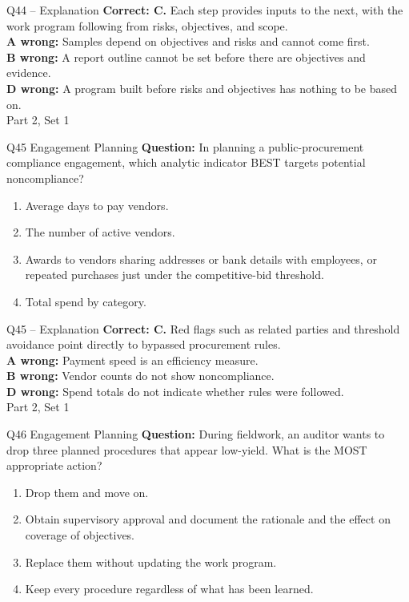 \documentclass[aspectratio=169,10pt]{beamer}
\begin{document}
\begin{frame}[t]{Q44 -- Explanation}
	\footnotesize
	\textbf{Correct: C.} Each step provides inputs to the next, with the work program following from risks, objectives, and scope. \\[5pt]
\textbf{A wrong:} Samples depend on objectives and risks and cannot come first. \\[3pt]
\textbf{B wrong:} A report outline cannot be set before there are objectives and evidence. \\[3pt]
\textbf{D wrong:} A program built before risks and objectives has nothing to be based on. \\[3pt]
	\vfill {\tiny Part 2, Set 1}
\end{frame}
\begin{frame}[t]{Q45 \hfill {\scriptsize Engagement Planning}}
	\small
	\textbf{Question:} In planning a public-procurement compliance engagement, which analytic indicator BEST targets potential noncompliance?
	\begin{enumerate}[label=\Alph*.,itemsep=1pt,topsep=3pt]
			\item Average days to pay vendors.
			\item The number of active vendors.
			\item Awards to vendors sharing addresses or bank details with employees, or repeated purchases just under the competitive-bid threshold.
			\item Total spend by category.
	\end{enumerate}
\end{frame}
\begin{frame}[t]{Q45 -- Explanation}
	\footnotesize
	\textbf{Correct: C.} Red flags such as related parties and threshold avoidance point directly to bypassed procurement rules. \\[5pt]
\textbf{A wrong:} Payment speed is an efficiency measure. \\[3pt]
\textbf{B wrong:} Vendor counts do not show noncompliance. \\[3pt]
\textbf{D wrong:} Spend totals do not indicate whether rules were followed. \\[3pt]
	\vfill {\tiny Part 2, Set 1}
\end{frame}
\begin{frame}[t]{Q46 \hfill {\scriptsize Engagement Planning}}
	\small
	\textbf{Question:} During fieldwork, an auditor wants to drop three planned procedures that appear low-yield. What is the MOST appropriate action?
	\begin{enumerate}[label=\Alph*.,itemsep=1pt,topsep=3pt]
			\item Drop them and move on.
			\item Obtain supervisory approval and document the rationale and the effect on coverage of objectives.
			\item Replace them without updating the work program.
			\item Keep every procedure regardless of what has been learned.
	\end{enumerate}
\end{frame}
\end{document}

